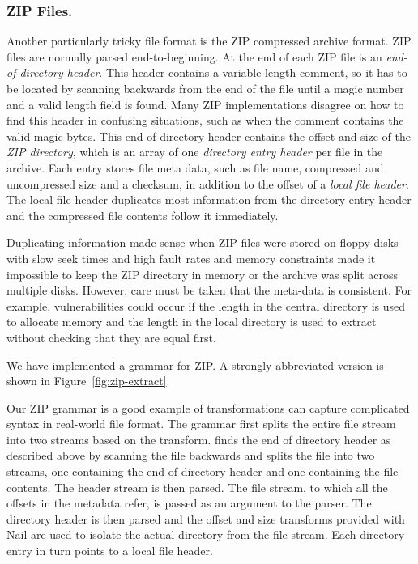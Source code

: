 \subsubsection{ZIP Files.}

\label{s:eval-format-zip}
Another particularly tricky file format is the ZIP compressed archive format\cite{pkzip}.
ZIP files are normally parsed end-to-beginning. At the end of each ZIP file is an \emph{end-of-directory
header}. This header contains a variable length comment, so it has to be located by scanning
backwards from the end of the file until a magic number and a valid length field is found. Many ZIP
implementations disagree on how to find this header in confusing situations, such as when the
comment contains the valid magic bytes\cite{wolf-berlinsides-zip}.
This end-of-directory header contains the offset and size of the \emph{ZIP directory}, which is an
array of one \emph{directory entry header} per file in the archive.
Each entry stores file meta data, such as file name, compressed and uncompressed size and a checksum,
in addition to the offset of a \emph{local file header}. The local file header duplicates most
information from the directory entry header and the compressed file contents follow it immediately.

Duplicating information made sense when ZIP files were
stored on floppy disks with slow seek times and high fault rates and memory constraints made it
impossible to keep the ZIP directory in memory or the archive was split across multiple disks.
However, care must be taken that the meta-data is consistent. For example, vulnerabilities could occur
if the length in the central directory is used to allocate memory and the length in the local
directory is used to extract without checking that they are equal first. 

We have implemented a grammar for ZIP. A strongly abbreviated version is shown in
Figure~\ref{fig:zip-extract}.

Our ZIP grammar is a good example of transformations can capture complicated syntax in real-world
file format. The  grammar first splits the entire file stream into two streams
based on the  transform.
finds the end of directory header as described above by scanning the file backwards and splits the
file into two streams, one containing the end-of-directory header and one containing the file
contents. The header stream is then parsed. The file stream, to which all the offsets in the
metadata refer, is passed as an argument to the  parser.
The directory header is then parsed and the offset and size transforms provided with Nail are used
to isolate the actual directory from the file stream. Each directory entry in turn points to a local
file header. 

